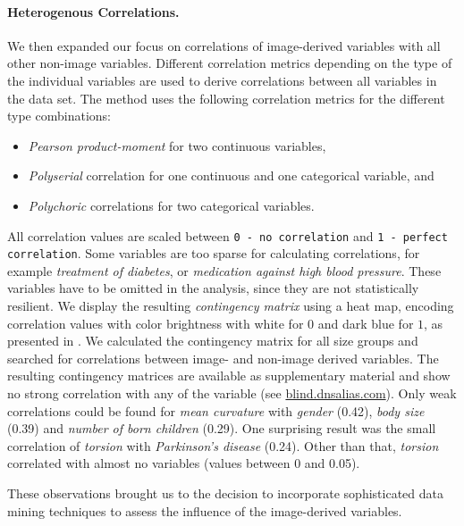 \documentclass[a4paper,twoside]{style/article}
\begin{document}
\paragraph{Heterogenous Correlations.}
We then expanded our focus on correlations of image-derived variables with all other non-image variables.
Different correlation metrics depending on the type of the individual variables are used to derive correlations between all variables in the data set.
The method uses the following correlation metrics for the different type combinations:
\begin{itemize}
\item \emph{Pearson product-moment} for two continuous variables, 
\item \emph{Polyserial} correlation for one continuous and one categorical variable, and
\item \emph{Polychoric} correlations for two categorical variables.
\end{itemize}
All correlation values are scaled between \texttt{0 - no correlation} and \texttt{1 - perfect correlation}.
Some variables are too sparse for calculating correlations, for example \emph{treatment of diabetes}, or \emph{medication against high blood pressure}.
These variables have to be omitted in the analysis, since they are not statistically resilient.
We display the resulting \emph{contingency matrix} using a heat map, encoding correlation values with color brightness with white for $0$ and dark blue for $1$, as presented in \cite{Klemm2014VIS}.
We calculated the contingency matrix for all size groups and searched for correlations between image- and non-image derived variables.
The resulting contingency matrices are available as supplementary material and show no strong correlation with any of the variable (see \url{blind.dnsalias.com}).
Only weak correlations could be found for \emph{mean curvature} with \emph{gender} (0.42), \emph{body size} (0.39) and \emph{number of born children} (0.29).
One surprising result was the small correlation of \emph{torsion} with \emph{Parkinson's disease} (0.24).
Other than that, \emph{torsion} correlated with almost no variables (values between 0 and 0.05).

These observations brought us to the decision to incorporate sophisticated data mining techniques to assess the influence of the image-derived variables.
\end{document}
